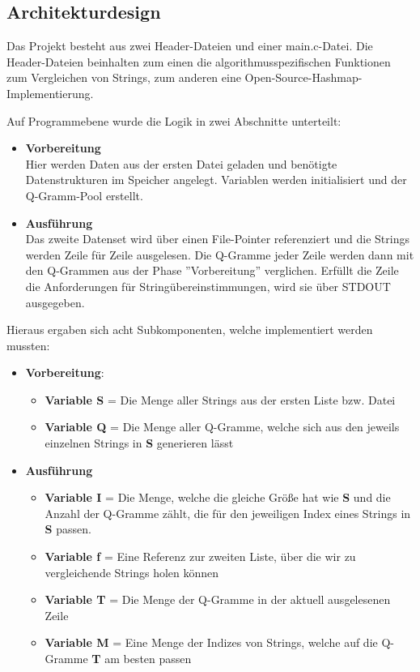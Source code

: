 \clearpage
\subsection{Architekturdesign}

Das Projekt besteht aus zwei Header-Dateien und einer main.c-Datei. Die Header-Dateien
beinhalten zum einen die algorithmusspezifischen Funktionen zum Vergleichen von
Strings, zum anderen eine Open-Source-Hashmap-Implementierung.

Auf Programmebene wurde die Logik in zwei Abschnitte unterteilt:
\begin{itemize}
    \item \textbf{Vorbereitung} \\
    Hier werden Daten aus der ersten Datei geladen und benötigte Datenstrukturen im Speicher angelegt.
    Variablen werden initialisiert und der Q-Gramm-Pool erstellt.
    \item \textbf{Ausführung} \\
    Das zweite Datenset wird über einen File-Pointer referenziert und die
    Strings werden Zeile für Zeile ausgelesen. Die Q-Gramme jeder Zeile werden dann mit den Q-Grammen aus der Phase ''Vorbereitung'' verglichen. Erfüllt die Zeile die Anforderungen für Stringübereinstimmungen, wird sie über STDOUT ausgegeben.
\end{itemize}

Hieraus ergaben sich acht Subkomponenten, welche implementiert werden mussten:


\begin{itemize}
    \item \textbf{Vorbereitung}:
    \begin{itemize}
        \item \textbf{Variable S} = Die Menge aller Strings aus der ersten Liste bzw. Datei
        \item \textbf{Variable Q} = Die Menge aller Q-Gramme, welche sich aus den jeweils einzelnen Strings in \textbf{S} generieren lässt
    \end{itemize}

    \item \textbf{Ausführung}
    \begin{itemize}
        \item \textbf{Variable I} = Die Menge, welche die gleiche Größe hat wie \textbf{S} und die
        Anzahl der Q-Gramme zählt, die für den jeweiligen Index eines Strings in
       \textbf{S} passen.
        \item \textbf{Variable f} = Eine Referenz zur zweiten Liste, über die wir zu vergleichende Strings holen können
        \item \textbf{Variable T} = Die Menge der Q-Gramme in der aktuell ausgelesenen Zeile
        \item \textbf{Variable M} = Eine Menge der Indizes von Strings, welche auf die Q-Gramme \textbf{T} am besten passen
    \end{itemize}
\end{itemize}

